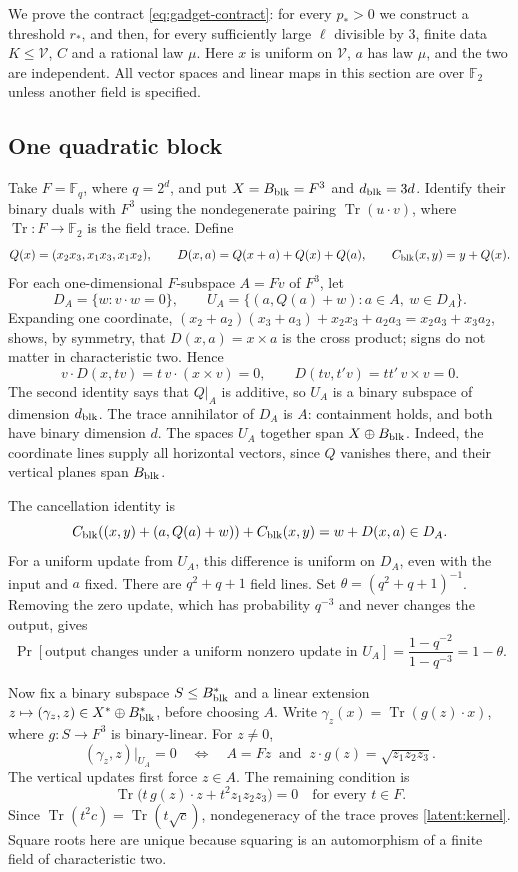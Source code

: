 \documentclass[11pt]{article}
\newcommand{\F}{\mathbb F}
\newcommand{\Tr}{\operatorname{Tr}}
\begin{document}
We prove the contract \eqref{eq:gadget-contract}: for every $p_*>0$ we
construct a threshold $r_*$, and then, for every sufficiently large $\ell$
divisible by $3$, finite data
$K\le\mathcal V$, $C$ and a rational law $\mu$. Here $x$ is uniform on
$\mathcal V$, $a$ has
law $\mu$, and the two are independent. All vector spaces and linear maps
in this section are over $\F_2$ unless another field is specified.

\subsection{One quadratic block}

Take $F=\F_q$, where $q=2^d$, and put $X=B_{\rm blk}=F^3$ and $d_{\rm blk}=3d$.
Identify their binary duals with $F^3$ using the nondegenerate pairing
$\Tr(u\cdot v)$, where $\Tr:F\to\F_2$ is the field trace. Define
\[
 Q(x)=(x_2x_3,x_1x_3,x_1x_2),\qquad
 D(x,a)=Q(x+a)+Q(x)+Q(a),\qquad
 C_{\rm blk}(x,y)=y+Q(x).
\]
For each one-dimensional $F$-subspace $A=Fv$ of $F^3$, let
\[
 D_A=\{w:v\cdot w=0\},\qquad
 U_A=\{(a,Q(a)+w):a\in A,\ w\in D_A\}.
\]
Expanding one coordinate, $(x_2+a_2)(x_3+a_3)+x_2x_3+a_2a_3=x_2a_3+x_3a_2$,
shows, by symmetry, that $D(x,a)=x\times a$ is the cross product; signs do not matter in
characteristic two. Hence
\[
 v\cdot D(x,tv)=t\,v\cdot(x\times v)=0,\qquad D(tv,t'v)=tt'\,v\times v=0.
\]
The second identity says that $Q|_A$ is additive, so $U_A$ is a binary subspace of dimension $d_{\rm blk}$.
The trace annihilator of $D_A$ is $A$: containment holds, and both have
binary dimension $d$. The spaces $U_A$ together span $X\oplus B_{\rm blk}$.
Indeed, the coordinate lines supply all horizontal vectors, since $Q$
vanishes there, and their vertical planes span $B_{\rm blk}$.

The cancellation identity is
\[
 C_{\rm blk}((x,y)+(a,Q(a)+w))+C_{\rm blk}(x,y)
 =w+D(x,a)\in D_A.
\]
For a uniform update from $U_A$, this difference is uniform on $D_A$,
even with the input and $a$ fixed. There are $q^2+q+1$ field lines.
Set $\theta=(q^2+q+1)^{-1}$. Removing the zero update, which has
probability $q^{-3}$ and never changes the output, gives
\begin{equation}
 \Pr[\text{output changes under a uniform nonzero update in }U_A]
 =\frac{1-q^{-2}}{1-q^{-3}}=1-\theta.
 \label{latent:block-error}
\end{equation}

Now fix a binary subspace $S\le B_{\rm blk}^*$ and a linear extension
$z\mapsto(\gamma_z,z)\in X^*\oplus B_{\rm blk}^*$, before choosing $A$.
Write $\gamma_z(x)=\Tr(g(z)\cdot x)$, where $g:S\to F^3$ is binary-linear.
For $z\ne0$,
\begin{equation}
 (\gamma_z,z)|_{U_A}=0
 \quad\Longleftrightarrow\quad
 A=Fz\ \text{ and }\ z\cdot g(z)=\sqrt{z_1z_2z_3}.
 \label{latent:kernel}
\end{equation}
The vertical updates first force $z\in A$. The remaining condition is
\[
 \Tr\bigl(t\,g(z)\cdot z+t^2z_1z_2z_3\bigr)=0
 \quad\text{for every }t\in F.
\]
Since $\Tr(t^2c)=\Tr(t\sqrt c)$, nondegeneracy of the trace proves
\eqref{latent:kernel}. Square roots here are unique because squaring
is an automorphism of a finite field of characteristic two.
\end{document}

